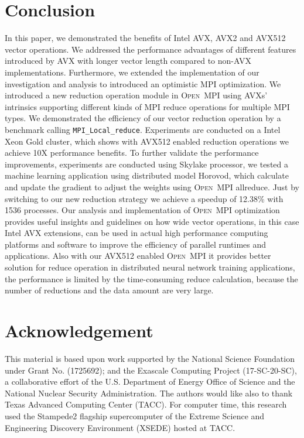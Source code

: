 \documentclass[sigconf,review]{acmart}
\newcommand{\mpifunc}[1]{\lstinline"MPI_#1"\xspace}
\newcommand{\ompi}[0]{\textsc{Open~MPI}\xspace}
\newcommand{\mpi}[0]{\textsc{MPI}\xspace}
\begin{document}
\section{Conclusion}\label{sec:conclusion}
In this paper, we demonstrated the benefits of Intel AVX, AVX2 and AVX512 vector operations. We
addressed the performance advantages of different features introduced by AVX
with longer vector length compared to non-AVX implementations. Furthermore,
we extended the implementation of our investigation and analysis to introduced
an optimistic \mpi optimization.
%
We introduced
a new reduction operation module in \ompi using AVXs' intrinsics supporting
different kinds of \mpi reduce operations for multiple \mpi types. We
demonstrated the efficiency of our vector reduction operation by a benchmark
calling \mpifunc{Local_reduce}. Experiments are conducted on a Intel Xeon Gold cluster,
which shows with AVX512 enabled reduction operations we achieve 10X performance benefits.
To further validate the performance improvements,
experiments are conducted using Skylake processor, we tested a machine learning application using distributed model Horovod, which calculate and update the gradient to adjust the weights using \ompi allreduce.
Just by switching to our new reduction strategy we achieve a speedup of 12.38\% with 1536 processes.
Our analysis and implementation of
\ompi optimization provides useful insights and guidelines on how wide vector operations, in this case Intel AVX extensions, can be used in actual high performance computing platforms and
software to improve the efficiency of parallel runtimes and applications.
Also with our AVX512 enabled \ompi it provides better solution for reduce operation in distributed neural network
training applications, the performance is limited by the time-consuming reduce calculation, because the number of reductions and the data amount are very large.

\section*{Acknowledgement}
%
This material is based upon work supported by the National Science Foundation under Grant No. (1725692); and the Exascale Computing Project (17-SC-20-SC), a collaborative effort of the
U.S. Department of Energy Office of Science and the National Nuclear Security Administration.
The authors would like also to thank
Texas Advanced Computing Center (TACC). For computer time, this research used
the Stampede2 flagship supercomputer of the Extreme Science and Engineering Discovery Environment (XSEDE) hosted at TACC.
%
%


\end{document}
